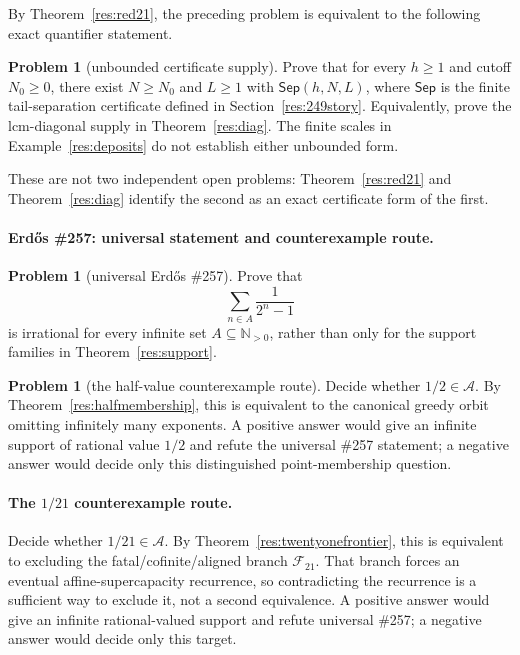 \documentclass[11pt]{article}
\theoremstyle{definition}
\newtheorem{problem}[theorem]{Problem}
\theoremstyle{remark}
\newcommand{\Npos}{\mathbb{N}_{>0}}
\begin{document}
By Theorem~\ref{res:red21}, the preceding problem is equivalent to the
following exact quantifier statement.

\begin{problem}[unbounded certificate supply]
Prove that for every \(h\ge1\) and cutoff \(N_0\ge0\), there exist
\(N\ge N_0\) and \(L\ge1\) with \(\mathsf{Sep}(h,N,L)\), where
\(\mathsf{Sep}\) is the finite tail-separation certificate defined in
Section~\ref{res:249story}.
Equivalently, prove the lcm-diagonal supply in
Theorem~\ref{res:diag}.  The finite scales in
Example~\ref{res:deposits} do not establish either unbounded form.
\end{problem}

These are not two independent open problems: Theorem~\ref{res:red21} and
Theorem~\ref{res:diag} identify the second as an exact certificate form of
the first.

\paragraph{Erd\H{o}s \#257: universal statement and counterexample route.}
\begin{problem}[universal Erd\H{o}s \#257]
Prove that
\[
  \sum_{n\in A}\frac{1}{2^n-1}
\]
is irrational for every infinite set $A\subseteq\Npos$, rather than only for the
support families in Theorem~\ref{res:support}.
\end{problem}

\begin{problem}[the half-value counterexample route]
Decide whether $1/2\in\mathcal A$.  By
Theorem~\ref{res:halfmembership}, this is equivalent to the canonical greedy
orbit omitting infinitely many exponents.  A positive answer would give an
infinite support of rational value $1/2$ and refute the universal \#257
statement; a negative answer would decide only this distinguished
point-membership question.
\end{problem}

\paragraph{The \(1/21\) counterexample route.}
Decide whether \(1/21\in\mathcal A\).  By
Theorem~\ref{res:twentyonefrontier}, this is equivalent to excluding the
fatal/cofinite/aligned branch \(\mathcal F_{21}\).  That branch forces an
eventual affine-supercapacity recurrence, so contradicting the recurrence is
a sufficient way to exclude it, not a second equivalence.  A positive
answer would give an infinite rational-valued support and refute universal
\#257; a negative answer would decide only this target.
\end{document}
